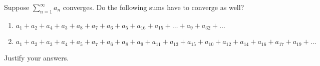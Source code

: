 \documentclass{article}
\begin{document}
\setlength{\parindent}{0pt}
Suppose $\sum_{n=1}^\infty a_n$ converges.
Do the following sums have to converge as well?
\begin{enumerate}[label=\alph*)]
\item$ a_1+a_2+a_4+a_3+a_8+a_7+a_6+a_5+a_{16}+a_{15}+\dots +a_9 + a_{32} +\dots$
\item $a_1+a_2+a_3+a_4+a_5+a_7+a_6+a_8+a_9+a_{11}+a_{13}+a_{15}+a_{10}+a_{12}+a_{14}+a_{16}+a_{17}+a_{19}+\dots$
\end{enumerate}
Justify your answers.
\end{document}
